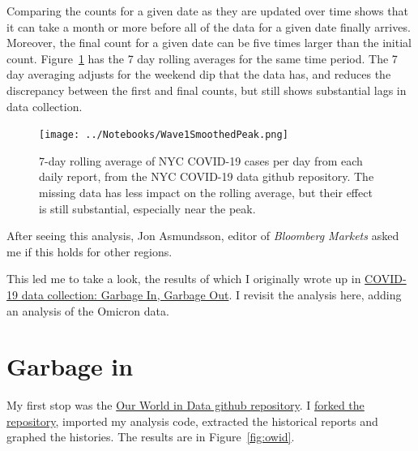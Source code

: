 \documentclass[10pt,reqno]{amsart}
\begin{document}
Comparing the counts for a given date as they are updated over time
shows that it can take a month or more before all of the data for
a given date finally arrives.  Moreover, the final count for a given date
can be five times larger than the initial count.
Figure~\ref{fig:smoothDaily} has the 7 day rolling averages for the same
time period.  The 7 day averaging adjusts for the weekend dip that the
data has, and reduces the discrepancy between the first and final
counts, but still shows substantial lags in data collection.

\begin{figure}[!htb]
  \centering
  \texttt{[image: ../Notebooks/Wave1SmoothedPeak.png]}
  \caption{7-day rolling average of NYC COVID-19 cases per day from
    each daily report, from the NYC COVID-19 data github repository.
    The missing data has less impact on the rolling average, but their
  effect is still substantial, especially near the peak.}
  \label{fig:smoothDaily}
\end{figure}

After seeing this analysis, Jon Asmundsson, editor of {\it Bloomberg
  Markets} asked me if this holds for other regions. \cite{Asmundsson2020Dates}

This led me to take a look, the results of which I originally wrote up
in
\href{https://hjstein.blogspot.com/2020/05/covid-19-data-collection-garbage-in_33.html}{COVID-19
  data collection: Garbage In, Garbage Out}.\nocite{Stein2020Garbage}  I revisit the analysis
here, adding an analysis of the Omicron data.

\section{Garbage in}
My first stop was the
\href{https://github.com/owid/covid-19-data}{Our World in Data github
  repository}\nocite{owid2020data}.  I
\href{https://github.com/hjstein/covid-19-data}{forked the
  repository}, imported my analysis code, extracted the historical
reports and graphed the histories.  The results are in Figure~\ref{fig:owid}.
\end{document}
